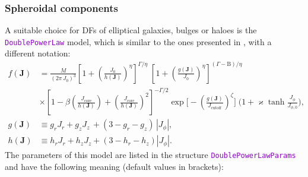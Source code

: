 \documentclass[12pt]{article}
\newcommand{\ttt}[1]{\textcolor{darkviolet}{\texttt{#1}}}
\newcommand{\bJ}{\boldsymbol{J}}
\newcommand{\Beta}{\mathrm B}
\begin{document}
\subsubsection{Spheroidal components}  \label{sec:DFspheroid}

A suitable choice for DFs of elliptical galaxies, bulges or haloes is the \ttt{DoublePowerLaw} model, which is similar to the ones presented in \cite{Binney2014, Posti2015}, with a different notation:
\begin{align*}
f(\bJ) &= \frac{M}{(2\pi\, J_0)^3}
\left[1 + \left(\frac{J_0}{h(\bJ)}\right)^\eta \right]^{\Gamma / \eta} \;
\left[1 + \left(\frac{g(\bJ)}{J_0}\right)^\eta \right]^{(\Gamma-\Beta) / \eta} \\
&\times
\left[1 - \beta\left(\frac{J_\mathrm{core}}{h(\bJ)}\right) + 
\left(\frac{J_\mathrm{core}}{h(\bJ)}\right)^2 \right]^{-\Gamma/2}
\exp\bigg[-\left(\frac{g(\bJ)}{J_\mathrm{cutoff}}\right)^\zeta\bigg] \;
\bigg(1 + \varkappa\tanh \frac{J_\phi}{J_{\phi,0}} \bigg), \\
g(\bJ) &\equiv g_r J_r + g_z J_z\, + (3-g_r-g_z)\, |J_\phi|, \\
h(\bJ) &\equiv h_r J_r + h_z J_z   + (3-h_r-h_z)   |J_\phi|.
\end{align*}
The parameters of this model are listed in the structure \ttt{DoublePowerLawParams} and have the following meaning (default values in brackets):
\end{document}

